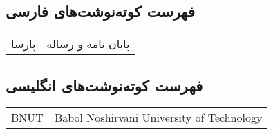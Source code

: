 \begin{center}
\section*{فهرست کوته‌نوشت‌های فارسی}
\end{center}



\begin{xltabular}[H]{0.9\textwidth}{l X}
پارسا     & پایان نامه و رساله\\
\end{xltabular}
\newpage





\begin{center}
\section*{فهرست کوته‌نوشت‌های انگلیسی}
\end{center}



\begin{latin}
\begin{xltabular}[H]{0.9\textwidth}{l X}
BNUT     & Babol Noshirvani University of Technology
\end{xltabular}
\end{latin}
\newpage